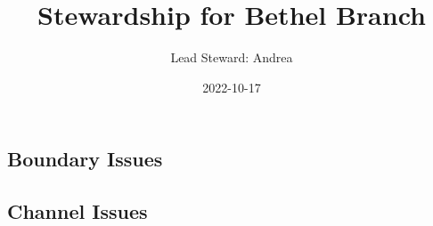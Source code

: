 \documentclass[
  landscape]{article}
\title{Stewardship for Bethel Branch}
\author{Lead Steward: Andrea}
\date{2022-10-17}
\begin{document}
\maketitle

\hypertarget{boundary-issues}{%
\subsection{Boundary Issues}\label{boundary-issues}}

\textbar\textbar{} \textbar\textbar{} \textbar\textbar{}
\textbar\textbar{}

\hypertarget{channel-issues}{%
\subsection{Channel Issues}\label{channel-issues}}
\end{document}
